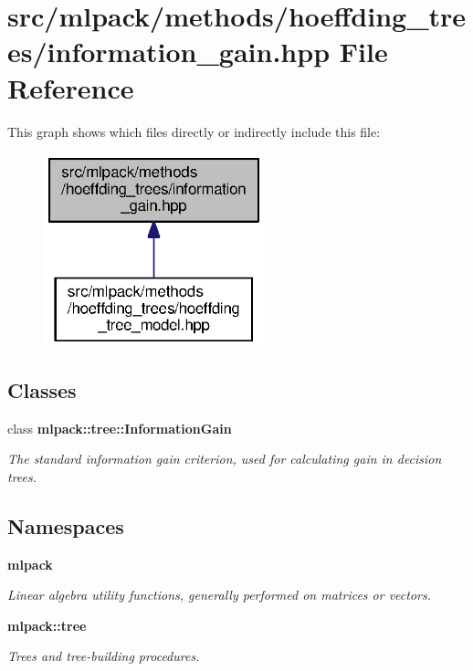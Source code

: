 \section{src/mlpack/methods/hoeffding\+\_\+trees/information\+\_\+gain.hpp File Reference}
\label{hoeffding__trees_2information__gain_8hpp}
This graph shows which files directly or indirectly include this file\+:
\nopagebreak
\begin{figure}[H]
\begin{center}
\leavevmode
\includegraphics[width=181pt]{hoeffding__trees_2information__gain_8hpp__dep__incl}
\end{center}
\end{figure}
\subsection*{Classes}
\begin{DoxyCompactItemize}
\item 
class {\bf mlpack\+::tree\+::\+Information\+Gain}
\begin{DoxyCompactList}\small\item\em The standard information gain criterion, used for calculating gain in decision trees. \end{DoxyCompactList}\end{DoxyCompactItemize}
\subsection*{Namespaces}
\begin{DoxyCompactItemize}
\item 
 {\bf mlpack}
\begin{DoxyCompactList}\small\item\em Linear algebra utility functions, generally performed on matrices or vectors. \end{DoxyCompactList}\item 
 {\bf mlpack\+::tree}
\begin{DoxyCompactList}\small\item\em Trees and tree-\/building procedures. \end{DoxyCompactList}\end{DoxyCompactItemize}
